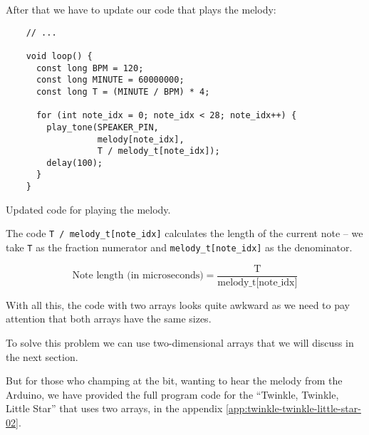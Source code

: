 \documentclass[../sparc.tex]{subfiles}
\begin{document}
After that we have to update our code that plays the melody:

\begin{listing}[H]
  \begin{verbatim}
    // ...

    void loop() {
      const long BPM = 120;
      const long MINUTE = 60000000;
      const long T = (MINUTE / BPM) * 4;

      for (int note_idx = 0; note_idx < 28; note_idx++) {
        play_tone(SPEAKER_PIN,
                  melody[note_idx],
                  T / melody_t[note_idx]);
        delay(100);
      }
    }
  \end{verbatim}
  \label{listing:music-array-example-5}
  \caption{Updated code for playing the melody.}
\end{listing}

The code \texttt{T / melody\_t[note\_idx]} calculates the length of the current
note -- we take \texttt{T} as the fraction numerator and
\texttt{melody\_t[note\_idx]} as the denominator.

\begin{equation}
  \mbox{Note length (in microseconds)} = \frac{\mbox{T}}{\mbox{melody\_t[note\_idx]}}
\end{equation}

With all this, the code with two arrays looks quite awkward as we need to pay
attention that both arrays have the same sizes.

To solve this problem we can use two-dimensional arrays that we will discuss in
the next section.

But for those who champing at the bit, wanting to hear the melody from the
Arduino, we have provided the full program code for the ``Twinkle, Twinkle,
Little Star'' that uses two arrays, in the appendix
\ref{app:twinkle-twinkle-little-star-02}.
\end{document}

